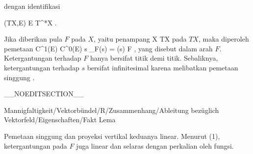 dengan identifikasi

\mavergleichskette
{\vergleichskette
{ (TX,E)
}
{ \cong }{ E \otimes T^*X
}
{  }{
}
{    }{
}
{   }{
}
}
{}{}{.}

Jika diberikan pula
$F$ pada $X$, yaitu penampang
 { X } { TX
} {}
pada
$TX$, maka diperoleh pemetaan
 {C^1(E)} {C^0(E)
} {s } {\nabla_F(s) = \nabla (s) \circ F
} {,}
yang disebut  {} dalam arah $F$. Ketergantungan terhadap $F$ hanya bersifat titik demi titik. Sebaliknya, ketergantungan terhadap $s$ bersifat infinitesimal karena melibatkan pemetaan singgung
.

__NOEDITSECTION__

{Mannigfaltigkeit/Vektorbündel/R/Zusammenhang/Ableitung bezüglich Vektorfeld/Eigenschaften/Fakt}
{Lema}
{}
{

\faktzusatz {}
\faktzusatz {}

}
{

 {Pemetaan singgung dan proyeksi vertikal keduanya linear. Menurut (1), ketergantungan pada $F$ juga linear dan selaras dengan perkalian oleh fungsi.
}

}

